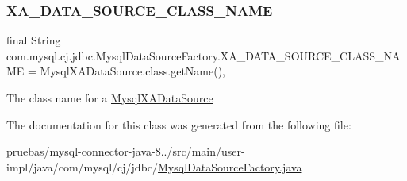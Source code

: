 \subsubsection{\texorpdfstring{X\+A\+\_\+\+D\+A\+T\+A\+\_\+\+S\+O\+U\+R\+C\+E\+\_\+\+C\+L\+A\+S\+S\+\_\+\+N\+A\+ME}{XA\_DATA\_SOURCE\_CLASS\_NAME}}
{\footnotesize\ttfamily final String com.\+mysql.\+cj.\+jdbc.\+Mysql\+Data\+Source\+Factory.\+X\+A\+\_\+\+D\+A\+T\+A\+\_\+\+S\+O\+U\+R\+C\+E\+\_\+\+C\+L\+A\+S\+S\+\_\+\+N\+A\+ME = Mysql\+X\+A\+Data\+Source.\+class.\+get\+Name()\hspace{0.3cm}{\ttfamily [static]}, {\ttfamily [protected]}}

The class name for a \mbox{\hyperlink{classcom_1_1mysql_1_1cj_1_1jdbc_1_1_mysql_x_a_data_source}{Mysql\+X\+A\+Data\+Source}} 

The documentation for this class was generated from the following file\+:\begin{DoxyCompactItemize}
\item 
pruebas/mysql-\/connector-\/java-\/8../src/main/user-\/impl/java/com/mysql/cj/jdbc/\mbox{\hyperlink{_mysql_data_source_factory_8java}{Mysql\+Data\+Source\+Factory.\+java}}\end{DoxyCompactItemize}
